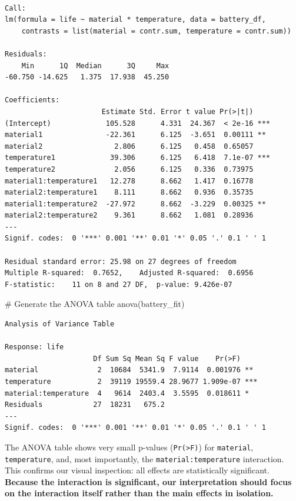\documentclass[
  letterpaper,
  DIV=11,
  numbers=noendperiod]{scrreprt}
\newenvironment{Shaded}{\begin{snugshade}}{\end{snugshade}}
\newcommand{\CommentTok}[1]{\textcolor[rgb]{0.37,0.37,0.37}{#1}}
\newcommand{\FunctionTok}[1]{\textcolor[rgb]{0.28,0.35,0.67}{#1}}
\newcommand{\NormalTok}[1]{\textcolor[rgb]{0.00,0.23,0.31}{#1}}
\begin{document}
\begin{verbatim}

Call:
lm(formula = life ~ material * temperature, data = battery_df, 
    contrasts = list(material = contr.sum, temperature = contr.sum))

Residuals:
    Min      1Q  Median      3Q     Max 
-60.750 -14.625   1.375  17.938  45.250 

Coefficients:
                       Estimate Std. Error t value Pr(>|t|)    
(Intercept)             105.528      4.331  24.367  < 2e-16 ***
material1               -22.361      6.125  -3.651  0.00111 ** 
material2                 2.806      6.125   0.458  0.65057    
temperature1             39.306      6.125   6.418  7.1e-07 ***
temperature2              2.056      6.125   0.336  0.73975    
material1:temperature1   12.278      8.662   1.417  0.16778    
material2:temperature1    8.111      8.662   0.936  0.35735    
material1:temperature2  -27.972      8.662  -3.229  0.00325 ** 
material2:temperature2    9.361      8.662   1.081  0.28936    
---
Signif. codes:  0 '***' 0.001 '**' 0.01 '*' 0.05 '.' 0.1 ' ' 1

Residual standard error: 25.98 on 27 degrees of freedom
Multiple R-squared:  0.7652,    Adjusted R-squared:  0.6956 
F-statistic:    11 on 8 and 27 DF,  p-value: 9.426e-07
\end{verbatim}

\begin{Shaded}
\begin{Highlighting}[]
\CommentTok{\# Generate the ANOVA table}
\FunctionTok{anova}\NormalTok{(battery\_fit)}
\end{Highlighting}
\end{Shaded}

\begin{verbatim}
Analysis of Variance Table

Response: life
                     Df Sum Sq Mean Sq F value    Pr(>F)    
material              2  10684  5341.9  7.9114  0.001976 ** 
temperature           2  39119 19559.4 28.9677 1.909e-07 ***
material:temperature  4   9614  2403.4  3.5595  0.018611 *  
Residuals            27  18231   675.2                      
---
Signif. codes:  0 '***' 0.001 '**' 0.01 '*' 0.05 '.' 0.1 ' ' 1
\end{verbatim}

The ANOVA table shows very small p-values (\texttt{Pr(\textgreater{}F)})
for \texttt{material}, \texttt{temperature}, and, most importantly, the
\texttt{material:temperature} interaction. This confirms our visual
inspection: all effects are statistically significant. \textbf{Because
the interaction is significant, our interpretation should focus on the
interaction itself rather than the main effects in isolation.}
\end{document}
